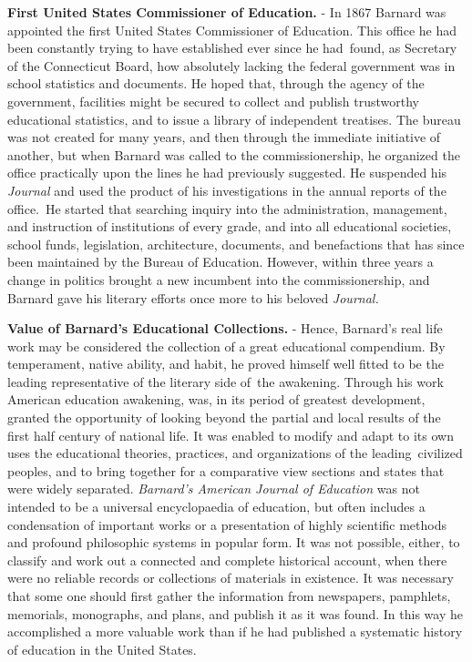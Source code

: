 \documentclass[
]{book}
\begin{document}
\textbf{First United States Commissioner of Education.} - In 1867 Barnard was appointed the first United States Commissioner of Education. This office he had been constantly trying to have established ever since he had~found, as Secretary of the Connecticut Board, how absolutely lacking the federal government was in school statistics and documents. He hoped that, through the agency of the government, facilities might be secured to collect and publish trustworthy educational statistics, and to issue a library of independent treatises. The bureau was not created for many years, and then through the immediate initiative of another, but when Barnard was called to the commissionership, he organized the office practically upon the lines he had previously suggested. He suspended his \emph{Journal} and used the product of his investigations in the annual reports of the office.~He started that searching inquiry into the administration, management, and instruction of institutions of every grade, and into all educational societies, school funds, legislation, architecture, documents, and benefactions that has since been maintained by the Bureau of Education. However, within three years a change in politics brought a new incumbent into the commissionership, and Barnard gave his literary efforts once more to his beloved \emph{Journal.}

\textbf{Value of Barnard's Educational Collections.} - Hence, Barnard's real life work may be considered the collection of a great educational compendium. By temperament, native ability, and habit, he proved himself well fitted to be the leading representative of the literary side of~the awakening. Through his work American education awakening, was, in its period of greatest development, granted the opportunity of looking beyond the partial and local results of the first half century of national life. It was enabled to modify and adapt to its own uses the educational theories, practices, and organizations of the leading~civilized peoples, and to bring together for a comparative view sections and states that were widely separated. \emph{Barnard's American Journal of Education} was not intended to be a universal encyclopaedia of education, but often includes a condensation of important works or a presentation of highly scientific methods and profound philosophic systems in popular form. It was not possible, either, to classify and work out a connected and complete historical account, when there were no reliable records or collections of materials in existence. It was necessary that some one should first gather the information from newspapers, pamphlets, memorials, monographs, and plans, and publish it as it was found. In this way he accomplished a more valuable work than if he had published a systematic history of education in the United States.
\end{document}
